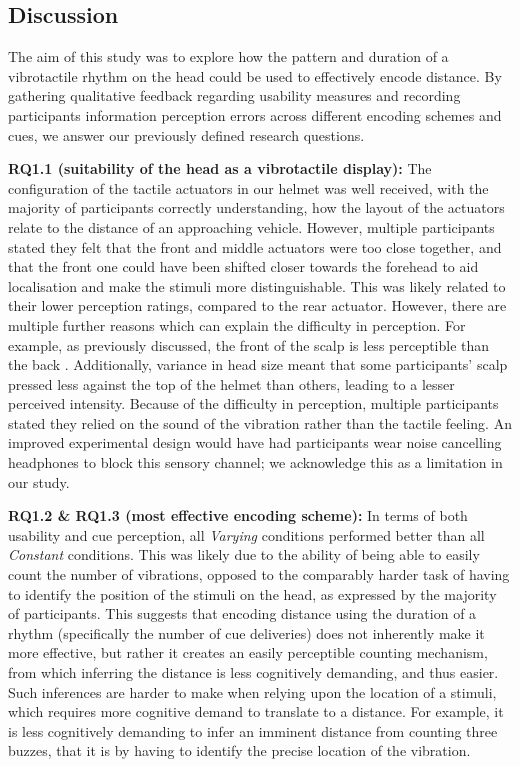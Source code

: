 \documentclass{mpaper}
\begin{document}
\subsection{Discussion}
The aim of this study was to explore how the pattern and duration of a vibrotactile rhythm on the head could be used to effectively encode distance. By gathering qualitative feedback regarding usability measures and recording participants information perception errors across different encoding schemes and cues, we answer our previously defined research questions.

\textbf{RQ1.1 (suitability of the head as a vibrotactile display):} The configuration of the tactile actuators in our helmet was well received, with the majority of participants correctly understanding, how the layout of the actuators relate to the distance of an approaching vehicle. However, multiple participants stated they felt that the front and middle actuators were too close together, and that the front one could have been shifted closer towards the forehead to aid localisation and make the stimuli more distinguishable. This was likely related to their lower perception ratings, compared to the rear actuator. However, there are multiple further reasons which can explain the difficulty in perception. For example, as previously discussed, the front of the scalp is less perceptible than the back \cite{headguidelines, MYLES2015177, 7463147}. Additionally, variance in head size meant that some participants' scalp pressed less against the top of the helmet than others, leading to a lesser perceived intensity. Because of the difficulty in perception, multiple participants stated they relied on the sound of the vibration rather than the tactile feeling. An improved experimental design would have had participants wear noise cancelling headphones to block this sensory channel; we acknowledge this as a limitation in our study.

\textbf{RQ1.2 \& RQ1.3 (most effective encoding scheme):} In terms of both usability and cue perception, all \textit{Varying} conditions performed better than all \textit{Constant} conditions. This was likely due to the ability of being able to easily count the number of vibrations, opposed to the comparably harder task of having to identify the position of the stimuli on the head, as expressed by the majority of participants. This suggests that encoding distance using the duration of a rhythm (specifically the number of cue deliveries) does not inherently make it more effective, but rather it creates an easily perceptible counting mechanism, from which inferring the distance is less cognitively demanding, and thus easier. Such inferences are harder to make when relying upon the location of a stimuli, which requires more cognitive demand to translate to a distance. For example, it is less cognitively demanding to infer an imminent distance from counting three buzzes, that it is by having to identify the precise location of the vibration. 
\end{document}
